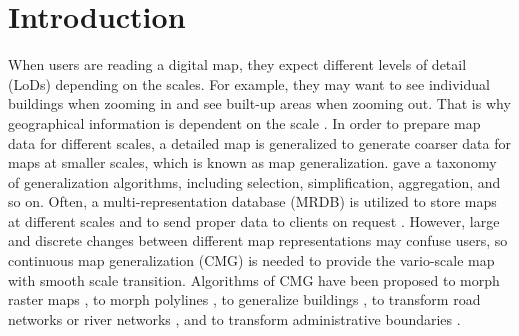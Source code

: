 \documentclass{ica}
\begin{document}


\maketitle

\thispagestyle{first}


\section{Introduction}

When users are reading a digital map,
they expect different levels of detail (LoDs) depending on the scales.
For example, they may want to see individual buildings when zooming in
and see built-up areas when zooming out.
That is why geographical information is dependent on the scale
\citep{Muller1995Generalization,Weibel1997}. 
In order to prepare map data for different scales,
a detailed map is generalized to generate coarser data 
for maps at smaller scales,
which is known as map generalization.
\citet{Mackaness2017Generalization} gave a taxonomy of 
generalization algorithms, 
including selection, simplification, aggregation, and so on.
Often, a multi-representation database (MRDB) is utilized to store
maps at different scales and to send proper data to clients on request
\citep[\eg][]{Hampe2004multiple}.
However, large and discrete changes between different map representations
may confuse users,
so continuous map generalization (CMG) is needed to
provide the vario-scale map with smooth scale transition.
Algorithms of CMG have been proposed 
to morph raster maps
\citep[\eg][]{Pantazis2009a}, 
to morph polylines
\citep[\eg][]{Noellenburg2008,Deng2015,Li2017Annealing},
to generalize buildings
\citep[\eg][]{Li2017_Building,Touya2017Progressive},
to transform road networks or river networks
\citep[\eg][]{Suba2016Road,Chimani2014Eat,Huang2017Matrix},
and to transform administrative boundaries
\citep[\eg][]{Peng2016Admin}.

\end{document}
